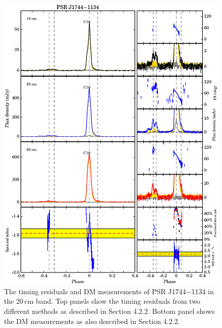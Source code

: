\documentclass[useAMS,usenatbib]{mn2e}
\begin{document}
\begin{appendix}
\begin{figure}
\includegraphics[width=6 in]{1744.ps}
\caption{The timing residuals and DM measurements of PSR J1744$-$1134 in the 20\,cm band. 
Top panels show the timing residuals from two different methods as described in Section 4.2.2.
Bottom panel shows the DM measurements as also described in Section 4.2.2.
}
\label{1744resi}
\end{figure}
%

\end{appendix}
\end{document}
